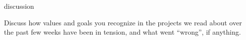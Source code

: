 \documentclass[aspectratio=169,17pt]{beamer} %
\begin{document}
\begin{frame}{discussion}

Discuss how values and goals you recognize in the projects we read about over the past few weeks have been in tension, and what went ``wrong'', if anything.
    

\end{frame}
\end{document}
